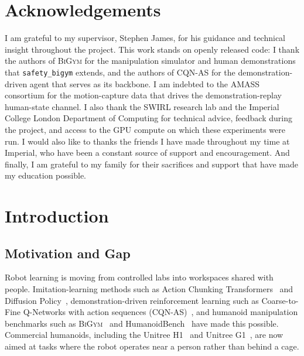\documentclass[11pt,a4paper]{report}
\newcommand{\bigym}{\textsc{BiGym}}
\newcommand{\sbigym}{\texttt{safety\_bigym}}
\newcommand{\cqnas}{CQN-AS}
\begin{document}
\chapter*{Acknowledgements}
I am grateful to my supervisor, Stephen James, for his guidance and
technical insight throughout the project. This work stands on openly released code: I
thank the authors of \bigym{} for the manipulation simulator and human
demonstrations that \sbigym{} extends, and the authors of \cqnas{} for
the demonstration-driven agent that serves as its backbone. I am
indebted to the \textsc{AMASS} consortium for the motion-capture data
that drives the demonstration-replay human-state channel. I also thank
the SWIRL research lab and the Imperial College London Department of
Computing for technical advice, feedback during the project, and access
to the GPU compute on which these experiments were run. 
I would also like to thanks the friends I have made throughout my time at Imperial, who have been a constant source of support and encouragement.
And finally, I am grateful to my family for their sacrifices and support that have made my education possible.


\tableofcontents
\begingroup
  \let\clearpage\relax
  \let\cleardoublepage\relax
  \listoffigures
  \listoftables
\endgroup


\chapter{Introduction}
\label{ch:intro}

\section{Motivation and Gap}
\label{sec:intro:motivation}

Robot learning is moving from controlled labs into workspaces shared
with people. Imitation-learning methods such as Action Chunking
Transformers~\cite{zhao2023act} and Diffusion
Policy~\cite{chi2023diffusion}, demonstration-driven reinforcement
learning such as Coarse-to-Fine Q-Networks with action sequences
(\cqnas{})~\cite{seo2024cqnas,seo2025actionsequence}, and humanoid
manipulation benchmarks such as \bigym{}~\cite{chernyadev2024bigym}
and HumanoidBench~\cite{sferrazza2024humanoidbench} have made this
possible. Commercial humanoids, including the Unitree H1~\cite{unitree_h1}
and Unitree G1~\cite{unitree_g1}, are now aimed at tasks where the
robot operates near a person rather than behind a cage.
\end{document}
